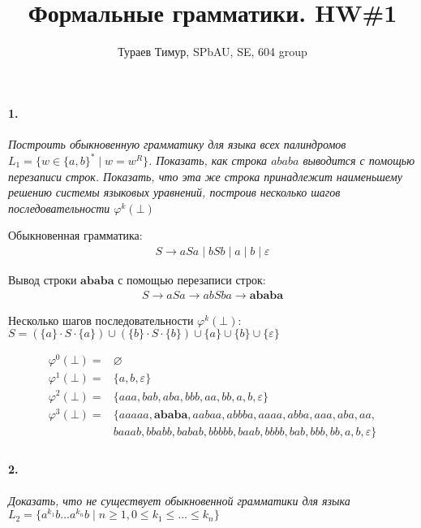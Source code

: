 \documentclass[russian]{article}
\begin{document}
\title{Формальные грамматики. HW\#1}
\author{Тураев Тимур, SPbAU, SE, 604 group}
\maketitle

\paragraph*{1.}

\textit{Построить обыкновенную грамматику для языка всех палиндромов $L_1 = \{ w \in \{a, b\}^* \mid w=w^R \}$. Показать, как строка $ababa$ выводится с помощью перезаписи строк. Показать, что эта же строка принадлежит наименьшему решению системы языковых уравнений, построив несколько шагов последовательности $\varphi^k(\bot)$}

Обыкновенная грамматика:
\begin{align*}
S \to aSa \mid bSb \mid a \mid b \mid \varepsilon
\end{align*}

Вывод строки $\textbf{ababa}$ с помощью перезаписи строк:
\begin{align*}
S \to aSa \to abSba \to \textbf{ababa}
\end{align*}

Несколько шагов последовательности $\varphi^k(\bot)$: \\
$S = (\{a\} \cdot S \cdot \{a\}) \cup  (\{b\} \cdot S \cdot \{b\}) \cup \{a\} \cup \{b\} \cup \{\varepsilon\}$

\begin{align*}
\varphi^0(\bot) = &\varnothing \\
\varphi^1(\bot) = &\{a, b, \varepsilon \} \\
\varphi^2(\bot) = &\{aaa, bab, aba, bbb, aa, bb, a, b, \varepsilon \} \\
\varphi^3(\bot) = &\{aaaaa, \textbf{ababa}, aabaa, abbba, aaaa, abba, aaa, aba, aa, \\
 & baaab, bbabb, babab, bbbbb, baab, bbbb, bab, bbb, bb, a, b, \varepsilon \} \\
\end{align*}

\paragraph*{2.}

\textit{Доказать, что не существует обыкновенной грамматики для языка $L_2=\{ a^{k_1} b \ldots a^{k_n} b \mid n \geqslant 1, 0 \leqslant k_1 \leqslant \ldots \leqslant k_n \}$}
\end{document}
